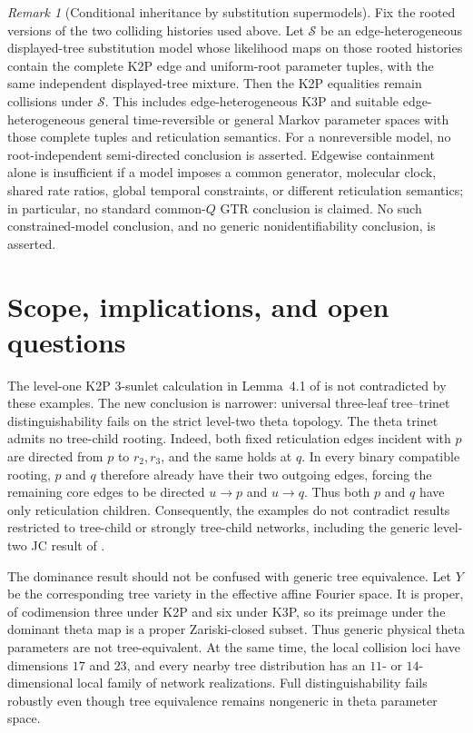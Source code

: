 \documentclass[11pt]{article}
\theoremstyle{remark}\newtheorem{remark}[theorem]{Remark}
\begin{document}
\begin{remark}[Conditional inheritance by substitution supermodels]\label{rem:supermodel}
Fix the rooted versions of the two colliding histories used above. Let $\mathcal S$ be an edge-heterogeneous displayed-tree substitution model whose likelihood maps on those rooted histories contain the complete K2P edge and uniform-root parameter tuples, with the same independent displayed-tree mixture. Then the K2P equalities remain collisions under $\mathcal S$. This includes edge-heterogeneous K3P and suitable edge-heterogeneous general time-reversible or general Markov parameter spaces with those complete tuples and reticulation semantics. For a nonreversible model, no root-independent semi-directed conclusion is asserted. Edgewise containment alone is insufficient if a model imposes a common generator, molecular clock, shared rate ratios, global temporal constraints, or different reticulation semantics; in particular, no standard common-$Q$ GTR conclusion is claimed. No such constrained-model conclusion, and no generic nonidentifiability conclusion, is asserted.
\end{remark}

\section{Scope, implications, and open questions}\label{sec:landscape}
The level-one K2P 3-sunlet calculation in Lemma~4.1 of \cite{BritsEtAl2026v3} is not contradicted by these examples. The new conclusion is narrower: universal three-leaf tree--trinet distinguishability fails on the strict level-two theta topology. The theta trinet admits no tree-child rooting. Indeed, both fixed reticulation edges incident with $p$ are directed from $p$ to $r_2,r_3$, and the same holds at $q$. In every binary compatible rooting, $p$ and $q$ therefore already have their two outgoing edges, forcing the remaining core edges to be directed $u\to p$ and $u\to q$. Thus both $p$ and $q$ have only reticulation children. Consequently, the examples do not contradict results restricted to tree-child or strongly tree-child networks, including the generic level-two JC result of \cite{EnglanderEtAl2025}.

The dominance result should not be confused with generic tree equivalence. Let $Y$ be the corresponding tree variety in the effective affine Fourier space. It is proper, of codimension three under K2P and six under K3P, so its preimage under the dominant theta map is a proper Zariski-closed subset. Thus generic physical theta parameters are not tree-equivalent. At the same time, the local collision loci have dimensions $17$ and $23$, and every nearby tree distribution has an $11$- or $14$-dimensional local family of network realizations. Full distinguishability fails robustly even though tree equivalence remains nongeneric in theta parameter space.
\end{document}
